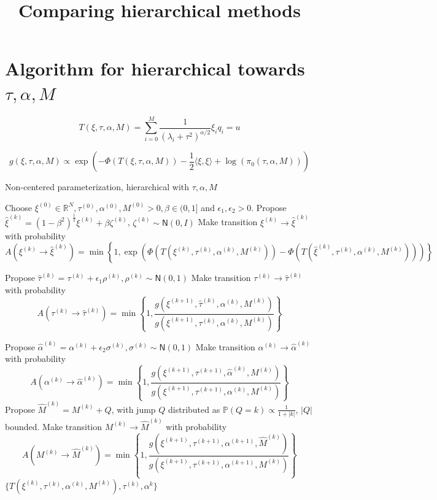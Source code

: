 \documentclass{siamart1116}
\title{Comparing hierarchical methods}
\author{\TheAuthors}
\date{}
\begin{document}
\maketitle
\setlength{\unitlength}{1in}
\setlength{\parindent}{0in}
\section{Algorithm for hierarchical towards $\tau, \alpha, M$}
\begin{equation}
\label{eqn:noncentered_T}
T(\xi,\tau,\alpha, M) = \sum_{i=0}^M \frac{1}{(\lambda_i+\tau^2)^{\alpha/2}}\xi_iq_i = u
\end{equation}


\begin{equation}
\label{eqn:noncentered_post}
g(\xi,\tau,\alpha, M) \propto \exp\left( -\Phi(T(\xi,\tau,\alpha,M))-\frac{1}{2}\langle \xi,\xi \rangle + \log(\pi_0(\tau,\alpha,M)) \right)
\end{equation}


\begin{algorithm}

\caption{Non-centered parameterization, hierarchical with $\tau, \alpha, M$}
\label{alg:hier_t_a_M}
\begin{algorithmic}
\State Choose $\xi^{(0)} \in \mathbb{R}^N, \tau^{(0)}, \alpha^{(0)}, M^{(0)} > 0, \beta \in (0, 1]$ and $\epsilon_1, \epsilon_2 > 0$.
\State Propose $\hat\xi^{(k)} = (1-\beta^2)^{\frac{1}{2}}\xi^{(k)} + \beta \zeta^{(k)}$, $\zeta^{(k)} \sim \mathsf{N}(0, I)$
\State Make transition $\xi^{(k)} \to \hat\xi^{(k)}$ with probability
\[ A(\xi^{(k)} \to \hat\xi^{(k)}) = \min\left\{1, \exp\left(\Phi(T(\xi^{(k)},\tau^{(k)},\alpha^{(k)}, M^{(k)})) - \Phi(T(\hat\xi^{(k)},\tau^{(k)},\alpha^{(k)}, M^{(k)}))\right) \right\}\] 

\State Propose $\hat\tau^{(k)} = \tau^{(k)} + \epsilon_1 \rho^{(k)}, \rho^{(k)} \sim \mathsf{N}(0,1)$
\State Make transition $\tau^{(k)} \to \hat\tau^{(k)}$ with probability
\[ A(\tau^{(k)} \to \hat\tau^{(k)}) 
= \min\left\{1, \frac{g(\xi^{(k+1)},\hat\tau^{(k)},\alpha^{(k)},M^{(k)})}{g(\xi^{(k+1)},\tau^{(k)},\alpha^{(k)},M^{(k)})} \right\}\] 

\State Propose $\hat\alpha^{(k)} = \alpha^{(k)} + \epsilon_2 \sigma^{(k)}, \sigma^{(k)} \sim \mathsf{N}(0,1)$
\State Make transition $\alpha^{(k)} \to \hat\alpha^{(k)}$ with probability
\[ A(\alpha^{(k)} \to \hat\alpha^{(k)}) 
= \min\left\{1, \frac{g(\xi^{(k+1)},\tau^{(k+1)},\hat \alpha^{(k)},M^{(k)})}{g(\xi^{(k+1)},\tau^{(k+1)},\alpha^{(k)},M^{(k)})} \right\}\]
\State Propose $\hat M^{(k)} = M^{(k)} + Q$, with jump $Q$ distributed as $\mathbb{P}(Q=k) \propto \frac{1}{1+|k|}$, $|Q|$ bounded.
\State Make transition $M^{(k)} \to \hat M^{(k)}$ with probability
\[ A(M^{(k)} \to \hat M^{(k)}) = 
\min\left\{1, \frac{g(\xi^{(k+1)},\tau^{(k+1)},\alpha^{(k+1)},\hat M^{(k)})}{g(\xi^{(k+1)},\tau^{(k+1)},\alpha^{(k+1)},M^{(k)})} \right\}
\]
\EndFor
\State \Return $\{ T(\xi^{(k)},\tau^{(k)},\alpha^{(k)}, M^{(k)}), \tau^{(k)}, \alpha^{k} \}$
\end{algorithmic}
\end{algorithm}
\end{document}

